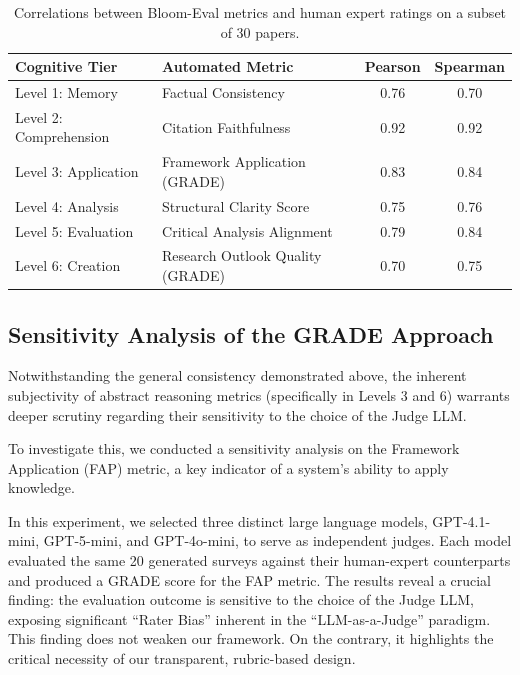 \documentclass[11pt]{article}
\begin{document}
\begin{table}[t] 
    \centering
    \caption{Correlations between Bloom-Eval metrics and human expert ratings on a subset of 30 papers.}
    \label{tab:human_corr_validation}
    \small
    \setlength{\tabcolsep}{10pt} %
    \begin{tabular}{llcc}
        \toprule
        Cognitive Tier & Automated Metric & Pearson & Spearman \\
        \midrule
        Level 1: Memory & Factual Consistency & 0.76 & 0.70 \\
        Level 2: Comprehension & Citation Faithfulness & 0.92 & 0.92 \\
        Level 3: Application & Framework Application (GRADE) & 0.83 & 0.84 \\
        Level 4: Analysis & Structural Clarity Score & 0.75 & 0.76 \\
        Level 5: Evaluation & Critical Analysis Alignment & 0.79 & 0.84 \\
        Level 6: Creation & Research Outlook Quality (GRADE) & 0.70 & 0.75 \\
        \bottomrule
    \end{tabular}
\end{table}

\subsection{Sensitivity Analysis of the GRADE Approach}
\label{sec:grade_sensitivity}

Notwithstanding the general consistency demonstrated above, the inherent subjectivity of abstract reasoning metrics (specifically in Levels 3 and 6) warrants deeper scrutiny regarding their sensitivity to the choice of the Judge LLM.

To investigate this, we conducted a sensitivity analysis on the Framework Application (FAP) metric, a key indicator of a system's ability to apply knowledge.

In this experiment, we selected three distinct large language models, GPT-4.1-mini, GPT-5-mini, and GPT-4o-mini, to serve as independent judges. Each model evaluated the same 20 generated surveys against their human-expert counterparts and produced a GRADE score for the FAP metric. The results reveal a crucial finding: the evaluation outcome is sensitive to the choice of the Judge LLM, exposing significant ``Rater Bias'' inherent in the ``LLM-as-a-Judge'' paradigm. This finding does not weaken our framework. On the contrary, it highlights the critical necessity of our transparent, rubric-based design.
\end{document}
